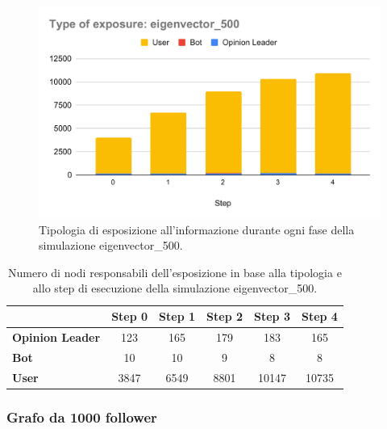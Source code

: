         \begin{figure}[H]
            \centering
            \includegraphics[width=.7\textwidth]{resources/charts/Type of exposure_ eigenvector_500.pdf}
            \caption{Tipologia di esposizione all'informazione durante ogni fase della simulazione eigenvector\_500.}
        \end{figure}
        
        \begin{table}[H]
            \centering
            \begin{tabular}{l|c|c|c|c|c}
                           & Step 0 & Step 1 & Step 2 & Step 3 & Step 4 \\ \hline
            \textbf{Opinion Leader} & 123    & 165    & 179    & 183    & 165    \\ \hline
            \textbf{Bot}            & 10     & 10     & 9      & 8      & 8      \\ \hline
            \textbf{User}           & 3847   & 6549   & 8801   & 10147  & 10735  \\
            \end{tabular}
            \caption{Numero di nodi responsabili dell'esposizione in base alla tipologia e allo step di esecuzione della simulazione eigenvector\_500.}
        \end{table}

        \subsubsection{Grafo da 1000 follower}

